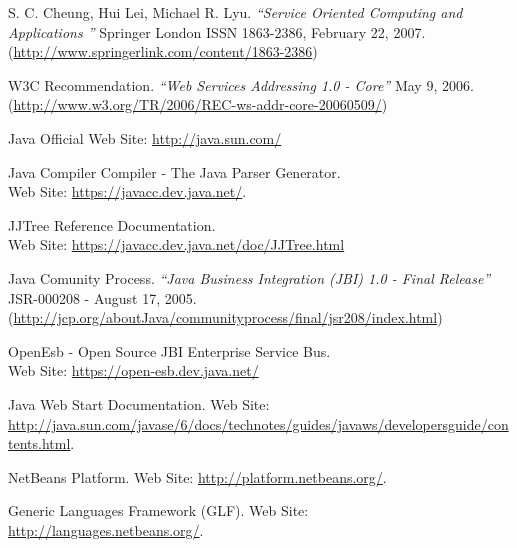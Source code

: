 \begin{thebibliography}{99}
 S. C. Cheung, Hui Lei, Michael R. Lyu. \emph{``Service Oriented
Computing and Applications ''} Springer London ISSN 1863-2386, February 22,
2007.  
(\href{http://www.springerlink.com/content/1863-2386}{http://www.springerlink.com/content/1863-2386})

  W3C Recommendation. \emph{``Web Services Addressing 1.0
- Core''} May 9, 2006. \\
(\href{http://www.w3.org/TR/2006/REC-ws-addr-core-20060509/}{http://www.w3.org/TR/2006/REC-ws-addr-core-20060509/})

 Java Official Web
Site: \href{http://java.sun.com/}{http://java.sun.com/}

 Java Compiler Compiler - The Java Parser
Generator. \\
Web Site: \href{https://javacc.dev.java.net/}{https://javacc.dev.java.net/}.

 JJTree Reference Documentation. \\
Web Site:
\href{https://javacc.dev.java.net/doc/JJTree.html}{https://javacc.dev.java.net/doc/JJTree.html}

 Java Comunity Process. \emph{``Java Business Integration (JBI)
1.0 - Final Release''} JSR-000208 - August 17, 2005. \\
(\href{http://jcp.org/aboutJava/communityprocess/final/jsr208/index.html}{http://jcp.org/aboutJava/communityprocess/final/jsr208/index.html})

 OpenEsb - Open Source JBI Enterprise Service Bus. \\
Web Site: \href{https://open-esb.dev.java.net/}{https://open-esb.dev.java.net/}

 Java Web Start Documentation. Web Site: \\
\href{http://java.sun.com/javase/6/docs/technotes/guides/javaws/developersguide/contents.html}{http://java.sun.com/javase/6/docs/technotes/guides/javaws/developersguide/contents.html}.

 NetBeans Platform. Web Site:
\href{http://platform.netbeans.org/}{http://platform.netbeans.org/}.


 Generic Languages Framework (GLF). Web Site: \\
\href{http://languages.netbeans.org/}{http://languages.netbeans.org/}.


\end{thebibliography}
